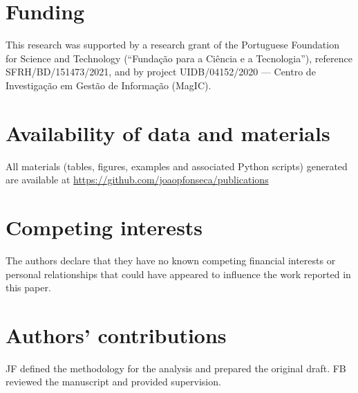 \documentclass{bmcart}
\begin{document}
\begin{backmatter}

\section*{Funding}%
This research was supported by a research grant of the Portuguese Foundation
for Science and Technology (``Fundação para a Ciência e a Tecnologia''),
reference SFRH/BD/151473/2021, and by project UIDB/04152/2020 — Centro de
Investigação em Gestão de Informação (MagIC).

\section*{Availability of data and materials}%
All materials (tables, figures, examples and associated Python scripts)
generated are available at
\href{https://github.com/joaopfonseca/publications}{https://github.com/joaopfonseca/publications}

\section*{Competing interests}
The authors declare that they have no known competing financial interests or
personal relationships that could have appeared to influence the work reported
in this paper.

\section*{Authors' contributions}
JF defined the methodology for the analysis and prepared the original draft.
FB reviewed the manuscript and provided supervision.




\end{backmatter}
\end{document}

